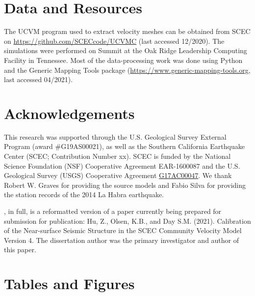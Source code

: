 

\section*{Data and Resources}
The UCVM program used to extract velocity meshes can be obtained from SCEC on \url{https://github.com/SCECcode/UCVMC} (last accessed 12/2020). The simulations were performed on Summit at the Oak Ridge Leadership Computing Facility in Tennessee. Most of the data-processing work was done using Python and the Generic Mapping Tools package (\url{https://www.generic-mapping-tools.org}, last accessed 04/2021).


\section*{Acknowledgements}

This research was supported through the U.S. Geological Survey External Program (award \#G19AS00021), as well as the Southern California Earthquake Center (SCEC; Contribution Number xx). SCEC is funded by the National Science Foundation (NSF) Cooperative Agreement EAR-1600087 and the U.S. Geological Survey (USGS) Cooperative Agreement \url{G17AC00047}. We thank Robert W. Graves for providing the source models and Fabio Silva for providing the station records of the 2014 La Habra earthquake.

, in full, is a reformatted version of a paper currently being prepared for submission for publication: Hu, Z., Olsen, K.B., and Day S.M. (2021). Calibration of the Near-surface Seismic Structure in the SCEC Community Velocity Model Version 4.
The dissertation author was the primary investigator and author of this paper.


\newpage
\section*{Tables and Figures}
%



